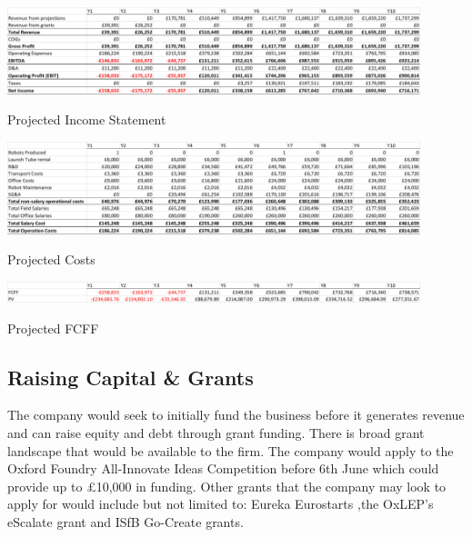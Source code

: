 \documentclass[11pt]{article}		%
\begin{document}
			    
			    
			    
		        \begin{table}[H]
					\centering
					\includegraphics[width=0.9\textwidth]{Income_statement_v1}
					\caption{Projected Income Statement}
					\label{forecast_PL}
				\end{table}
		            
		      	\begin{table}[H]
					\centering
					\includegraphics[width=0.9\textwidth]{Costs_v1}
					\caption{Projected Costs}
					\label{forecast_costs}
				\end{table}
				
		 		\begin{table}[H]
					\centering
					\includegraphics[width=0.9\textwidth]{FCFF_v1}
					\caption{Projected FCFF}
					\label{forecast_FCF}
				\end{table}
				
			 
			    
			    
		\subsection{Raising Capital \& Grants} \label{raisingFunds}
		  
		  The company would seek to initially fund the business before it generates revenue and can raise equity and debt through grant funding. There is broad grant landscape that would be available to the firm. The company would apply to the Oxford Foundry All-Innovate Ideas Competition before 6th June which could provide up to £10,000 in funding.  Other grants that the company may look to apply for would include but not limited to: Eureka Eurostarts  ,the OxLEP’s eScalate grant  and ISfB Go-Create grants.
            
\end{document}
